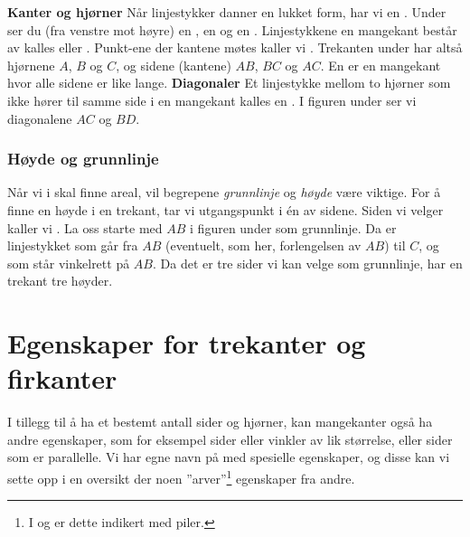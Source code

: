 \newpage
\textbf{Kanter og hjørner} \os
Når linjestykker danner en lukket form, har vi en . Under ser du (fra venstre mot høyre) en , en  og en .
Linjestykkene en mangekant består av kalles  eller . Punkt-ene der kantene møtes kaller vi . Trekanten under har altså hjørnene $ A $, $ B $ og $ C $, og sidene (kantene) $ AB $, $ BC $ og $ AC $.
En  er en mangekant hvor alle sidene er like lange.
\textbf{Diagonaler} \os
Et linjestykke mellom to hjørner som ikke hører til samme side i en mangekant kalles en . I figuren under ser vi \\diagonalene $ AC $ og $ BD $.
\newpage
\subsubsection{Høyde og grunnlinje \label{grunnlinje}}
Når vi i  skal finne areal, vil begrepene \textit{grunnlinje} og \textit{høyde} være viktige. For å finne en høyde i en trekant, tar vi utgangspunkt i én av sidene. Siden vi velger kaller vi . La oss starte med $ AB $ i figuren under som grunnlinje. Da er  linjestykket som går fra $ AB $ (eventuelt, som her, forlengelsen av $ AB $) til $ C $, og som står vinkelrett på $ AB $.
Da det er tre sider vi kan velge som grunnlinje, har en trekant tre høyder.
\section{Egenskaper for trekanter og firkanter}
I tillegg til å ha et bestemt antall sider og hjørner, kan mangekanter også ha andre egenskaper, som for eksempel sider eller vinkler av lik størrelse, eller sider som er parallelle. Vi har egne navn på  med spesielle egenskaper, og disse kan vi sette opp i en oversikt der noen ''arver''\footnote{I  og  er dette indikert med piler.} egenskaper fra andre.\regv


